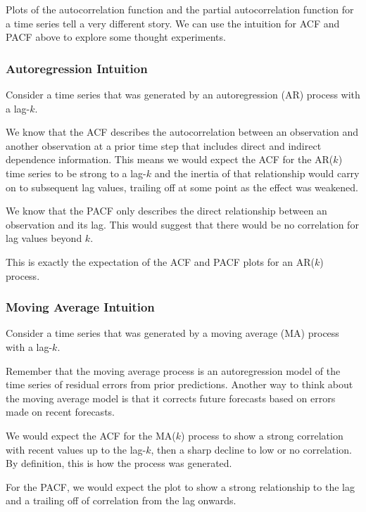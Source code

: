 \documentclass[11pt]{article}
\begin{document}
Plots of the autocorrelation function and the partial autocorrelation
function for a time series tell a very different story. We can use the
intuition for ACF and PACF above to explore some thought experiments.

\hypertarget{autoregression-intuition}{%
\subsubsection{Autoregression
Intuition}\label{autoregression-intuition}}

Consider a time series that was generated by an autoregression (AR)
process with a lag-\(k\).

We know that the ACF describes the autocorrelation between an
observation and another observation at a prior time step that includes
direct and indirect dependence information. This means we would expect
the ACF for the AR(\(k\)) time series to be strong to a lag-\(k\) and
the inertia of that relationship would carry on to subsequent lag
values, trailing off at some point as the effect was weakened.

We know that the PACF only describes the direct relationship between an
observation and its lag. This would suggest that there would be no
correlation for lag values beyond \(k\).

This is exactly the expectation of the ACF and PACF plots for an
AR(\(k\)) process.

\hypertarget{moving-average-intuition}{%
\subsubsection{Moving Average
Intuition}\label{moving-average-intuition}}

Consider a time series that was generated by a moving average (MA)
process with a lag-\(k\).

Remember that the moving average process is an autoregression model of
the time series of residual errors from prior predictions. Another way
to think about the moving average model is that it corrects future
forecasts based on errors made on recent forecasts.

We would expect the ACF for the MA(\(k\)) process to show a strong
correlation with recent values up to the lag-\(k\), then a sharp decline
to low or no correlation. By definition, this is how the process was
generated.

For the PACF, we would expect the plot to show a strong relationship to
the lag and a trailing off of correlation from the lag onwards.
\end{document}
